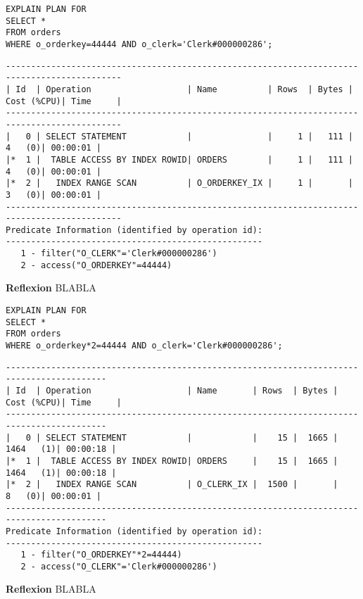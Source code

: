 \documentclass[10pt]{article}
\begin{document}
\begin{lstlisting}[style=sql]
EXPLAIN PLAN FOR
SELECT *
FROM orders
WHERE o_orderkey=44444 AND o_clerk='Clerk#000000286';
\end{lstlisting}
\begin{lstlisting}[style=queryexecutionplan]
---------------------------------------------------------------------------------------------
| Id  | Operation                   | Name          | Rows  | Bytes | Cost (%CPU)| Time     |
---------------------------------------------------------------------------------------------
|   0 | SELECT STATEMENT            |               |     1 |   111 |     4   (0)| 00:00:01 |
|*  1 |  TABLE ACCESS BY INDEX ROWID| ORDERS        |     1 |   111 |     4   (0)| 00:00:01 |
|*  2 |   INDEX RANGE SCAN          | O_ORDERKEY_IX |     1 |       |     3   (0)| 00:00:01 |
---------------------------------------------------------------------------------------------
Predicate Information (identified by operation id):
---------------------------------------------------
   1 - filter("O_CLERK"='Clerk#000000286')
   2 - access("O_ORDERKEY"=44444)
\end{lstlisting}
\textbf{Reflexion} \newline
BLABLA

\begin{lstlisting}[style=sql]
EXPLAIN PLAN FOR
SELECT *
FROM orders
WHERE o_orderkey*2=44444 AND o_clerk='Clerk#000000286';
\end{lstlisting}
\begin{lstlisting}[style=queryexecutionplan]
------------------------------------------------------------------------------------------
| Id  | Operation                   | Name       | Rows  | Bytes | Cost (%CPU)| Time     |
------------------------------------------------------------------------------------------
|   0 | SELECT STATEMENT            |            |    15 |  1665 |  1464   (1)| 00:00:18 |
|*  1 |  TABLE ACCESS BY INDEX ROWID| ORDERS     |    15 |  1665 |  1464   (1)| 00:00:18 |
|*  2 |   INDEX RANGE SCAN          | O_CLERK_IX |  1500 |       |     8   (0)| 00:00:01 |
------------------------------------------------------------------------------------------
Predicate Information (identified by operation id):
---------------------------------------------------
   1 - filter("O_ORDERKEY"*2=44444)
   2 - access("O_CLERK"='Clerk#000000286')
\end{lstlisting}
\textbf{Reflexion} \newline
BLABLA
\end{document}
